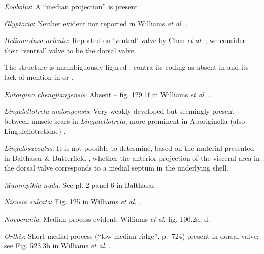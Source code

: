\documentclass[openany]{book}
\begin{document}
\hypertarget{Eoobolus-coding-99}{}
\emph{Eoobolus}: A ``median projection'' is present \citep[fig. 4g
in][]{Balthasar2009Thebrachiopod}.

\hypertarget{Glyptoria-coding-99}{}
\emph{Glyptoria}: Neither evident nor reported in Williams \emph{et al}.
\citeyearpar{Williams2000LinguliformeaCraniiformea}.

\hypertarget{Heliomedusa_orienta-coding-99}{}
\emph{Heliomedusa orienta}: Reported on `ventral' valve by Chen \emph{et
al}. \citeyearpar{Chen2007Reinterpretationof}; we consider their
`ventral' valve to be the dorsal valve.

The structure is unambiguously figured \citep[e.g.~fig. 5.1
in][]{Chen2007Reinterpretationof}, contra its coding as absent in
\citet{Williams2000LinguliformeaCraniiformea} and its lack of mention in
\citet{Williams2007Supplement} or \citet{Zhang2009Architectureand}.

\hypertarget{Kutorgina_chengjiangensis-coding-99}{}
\emph{Kutorgina chengjiangensis}: Absent -- fig. 129.1f in Williams
\emph{et al}. \citeyearpar{Williams2000LinguliformeaCraniiformea}.

\hypertarget{Lingulellotreta_malongensis-coding-99}{}
\emph{Lingulellotreta malongensis}: Very weakly developed but seemingly
present between muscle scars in \emph{Lingulellotreta}, more prominent
in Aboriginella (also Lingulellotretidae) \citep[fig.
34]{Williams2000LinguliformeaCraniiformea}.

\hypertarget{Lingulosacculus-coding-99}{}
\emph{Lingulosacculus}: It is not possible to determine, based on the
material presented in Balthasar \& Butterfield
\citeyearpar{Balthasar2009EarlyCambrian}, whether the anterior
projection of the visceral area in the dorsal valve corresponds to a
medial septum in the underlying shell.

\hypertarget{Mummpikia_nuda-coding-99}{}
\emph{Mummpikia nuda}: See pl. 2 panel 6 in Balthasar
\citeyearpar{Balthasar2008iMummpikia}.

\hypertarget{Nisusia_sulcata-coding-99}{}
\emph{Nisusia sulcata}: Fig. 125 in Williams \emph{et al}.
\citeyearpar{Williams2000LinguliformeaCraniiformea}.

\hypertarget{Novocrania-coding-99}{}
\emph{Novocrania}: Median process evident: Williams \emph{et al}.
\citeyearpar{Williams2000LinguliformeaCraniiformea} fig. 100.2a, d.

\hypertarget{Orthis-coding-99}{}
\emph{Orthis}: Short medial process (``low median ridge'', p.~724)
present in dorsal valve; see Fig. 523.3b in Williams \emph{et al}.
\citeyearpar{Williams2000LinguliformeaCraniiformea}.
\end{document}
